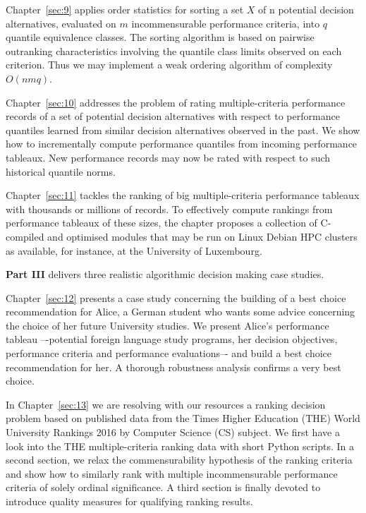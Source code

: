 Chapter~\ref{sec:9} applies order statistics for sorting a set $X$ of n potential decision alternatives, evaluated on $m$ incommensurable performance criteria, into $q$ quantile equivalence classes. The sorting algorithm is based on pairwise outranking characteristics involving the quantile class limits observed on each criterion. Thus we may implement a weak ordering algorithm of complexity $O(nmq)$.

Chapter~\ref{sec:10} addresses the problem of rating multiple-criteria performance records of a set of potential decision alternatives with respect to performance quantiles learned from similar decision alternatives observed in the past. We show how to incrementally compute performance quantiles from incoming performance tableaux. New performance records may now be rated with respect to such historical quantile norms.

Chapter~\ref{sec:11} tackles the ranking of big multiple-criteria performance tableaux with thousands or millions of records. To effectively compute rankings from performance tableaux of these sizes, the chapter proposes a collection of C-compiled and optimised modules that may be run on Linux Debian HPC clusters as available, for instance, at the University of Luxembourg.
\vspace{5pt}

\textbf{Part III} delivers three realistic algorithmic decision making case studies.

Chapter~\ref{sec:12} presents a case study concerning the building of a best choice recommendation for Alice, a German student who wants some advice concerning the choice of her future University studies. We present Alice’s performance tableau –-potential foreign language study programs, her decision objectives, performance criteria and performance evaluations–- and build a best choice recommendation for her. A thorough robustness analysis confirms a very best choice.

In Chapter~\ref{sec:13} we are resolving with our \Digraph resources a ranking decision problem based on published data from the Times Higher Education (THE) World University Rankings 2016 by Computer Science (CS) subject. We first have a look into the THE multiple-criteria ranking data with short Python scripts. In a second section, we relax the commensurability hypothesis of the ranking criteria and show how to similarly rank with multiple incommensurable performance criteria of solely ordinal significance. A third section is finally devoted to introduce quality measures for qualifying ranking results.

